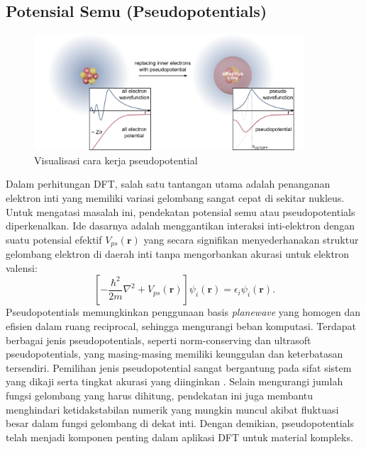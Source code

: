\subsection{Potensial Semu (Pseudopotentials)}
\begin{figure}[h!]
    \centering
    \includegraphics[width=0.9\textwidth]{gambar/pseudopotential}
    \caption{Visualisasi cara kerja pseudopotential \citep{pseudopotential}}
    \label{fig:pseudopotential}
\end{figure}
Dalam perhitungan DFT, salah satu tantangan utama adalah penanganan elektron inti yang memiliki variasi gelombang sangat cepat di sekitar nukleus.
Untuk mengatasi masalah ini, pendekatan potensial semu atau pseudopotentials diperkenalkan.
Ide dasarnya adalah menggantikan interaksi inti-elektron dengan suatu potensial efektif \(V_{ps}(\mathbf{r})\) yang secara signifikan menyederhanakan struktur gelombang elektron di daerah inti tanpa mengorbankan akurasi untuk elektron valensi:
\begin{equation}
    \left[-\frac{\hbar^2}{2m}\nabla^2 + V_{ps}(\mathbf{r})\right]\psi_i(\mathbf{r}) = \epsilon_i \psi_i(\mathbf{r}).
\end{equation}
Pseudopotentials memungkinkan penggunaan basis \emph{planewave} yang homogen dan efisien dalam ruang reciprocal, sehingga mengurangi beban komputasi.
Terdapat berbagai jenis pseudopotentials, seperti norm-conserving dan ultrasoft pseudopotentials, yang masing-masing memiliki keunggulan dan keterbatasan tersendiri.
Pemilihan jenis pseudopotential sangat bergantung pada sifat sistem yang dikaji serta tingkat akurasi yang diinginkan \citep{Payne1992}.
Selain mengurangi jumlah fungsi gelombang yang harus dihitung, pendekatan ini juga membantu menghindari ketidakstabilan numerik yang mungkin muncul akibat fluktuasi besar dalam fungsi gelombang di dekat inti.
Dengan demikian, pseudopotentials telah menjadi komponen penting dalam aplikasi DFT untuk material kompleks.

